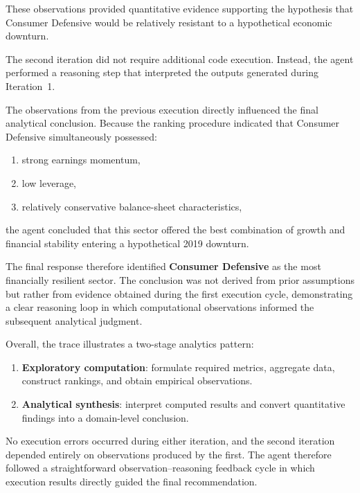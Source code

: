 These observations provided quantitative evidence supporting the hypothesis that Consumer Defensive would be relatively resistant to a hypothetical economic downturn.


The second iteration did not require additional code execution. Instead, the agent performed a reasoning step that interpreted the outputs generated during Iteration~1.

The observations from the previous execution directly influenced the final analytical conclusion. Because the ranking procedure indicated that Consumer Defensive simultaneously possessed:

\begin{enumerate}
  \item strong earnings momentum,
  \item low leverage,
  \item relatively conservative balance-sheet characteristics,
\end{enumerate}

the agent concluded that this sector offered the best combination of growth and financial stability entering a hypothetical 2019 downturn.

The final response therefore identified \textbf{Consumer Defensive} as the most financially resilient sector. The conclusion was not derived from prior assumptions but rather from evidence obtained during the first execution cycle, demonstrating a clear reasoning loop in which computational observations informed the subsequent analytical judgment.


Overall, the trace illustrates a two-stage analytics pattern:

\begin{enumerate}
  \item \textbf{Exploratory computation}: formulate required metrics, aggregate data, construct rankings, and obtain empirical observations.
  \item \textbf{Analytical synthesis}: interpret computed results and convert quantitative findings into a domain-level conclusion.
\end{enumerate}

No execution errors occurred during either iteration, and the second iteration depended entirely on observations produced by the first. The agent therefore followed a straightforward observation--reasoning feedback cycle in which execution results directly guided the final recommendation.
